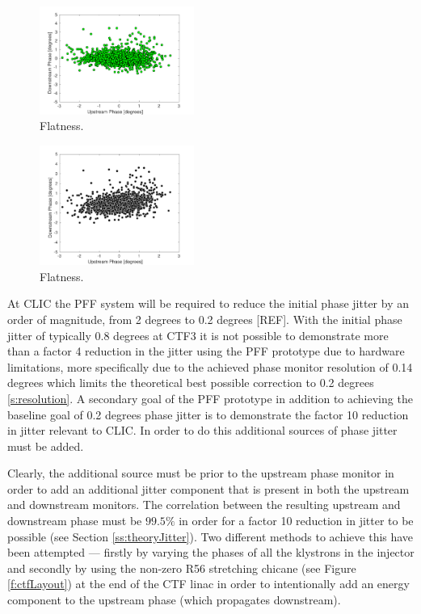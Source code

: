 \begin{figure}
  \centering
  \includegraphics[width=0.45\textwidth]{Figures/feedforward/longFF_scatterFFSimOpt}
  \caption{Flatness.}
  \label{f:longFF_scatterFFSimOpt}
\end{figure}

\begin{figure}
  \centering
  \includegraphics[width=0.45\textwidth]{Figures/feedforward/longFF_scatterFFSimReal}
  \caption{Flatness.}
  \label{f:longFF_scatterFFSimReal}
\end{figure}





At CLIC the PFF system will be required to reduce the initial phase jitter by an order of magnitude, from 2 degrees to 0.2 degrees [REF]. With the initial phase jitter of typically 0.8 degrees at CTF3 it is not possible to demonstrate more than a factor 4 reduction in the jitter using the PFF prototype due to hardware limitations, more specifically due to the achieved phase monitor resolution of 0.14 degrees which limits the theoretical best possible correction to 0.2 degrees \ref{s:resolution}. A secondary goal of the PFF prototype in addition to achieving the baseline goal of 0.2 degrees phase jitter is to demonstrate the factor 10 reduction in jitter relevant to CLIC. In order to do this additional sources of phase jitter must be added.

Clearly, the additional source must be prior to the upstream phase monitor in order to add an additional jitter component that is present in both the upstream and downstream monitors. The correlation between the resulting upstream and downstream phase must be  \(99.5\%\) in order for a factor 10 reduction in jitter to be possible (see Section \ref{ss:theoryJitter}). Two different methods to achieve this have been attempted --- firstly by varying the phases of all the klystrons in the injector and secondly by using the non-zero R56 stretching chicane (see Figure \ref{f:ctfLayout}) at the end of the CTF linac in order to intentionally add an energy component to the upstream phase (which propagates downstream).

